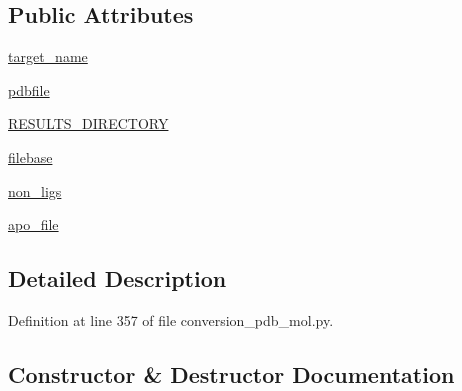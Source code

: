 \subsection*{Public Attributes}
\begin{DoxyCompactItemize}
\item 
\hyperlink{classfragalysis__api_1_1xcimporter_1_1conversion__pdb__mol_1_1pdb__apo_a334c98d4dfa204c7673f2f0bffdc60e1}{target\+\_\+name}
\item 
\hyperlink{classfragalysis__api_1_1xcimporter_1_1conversion__pdb__mol_1_1pdb__apo_a3c88c5322210bd36204fef2310fb80ce}{pdbfile}
\item 
\hyperlink{classfragalysis__api_1_1xcimporter_1_1conversion__pdb__mol_1_1pdb__apo_a110bfcd93d73bebd25ec64b258bd5b6a}{R\+E\+S\+U\+L\+T\+S\+\_\+\+D\+I\+R\+E\+C\+T\+O\+RY}
\item 
\hyperlink{classfragalysis__api_1_1xcimporter_1_1conversion__pdb__mol_1_1pdb__apo_a120a453eb2a3608650eda92ee0dc9ef9}{filebase}
\item 
\hyperlink{classfragalysis__api_1_1xcimporter_1_1conversion__pdb__mol_1_1pdb__apo_a53ed76d729f8d926151385334f611545}{non\+\_\+ligs}
\item 
\hyperlink{classfragalysis__api_1_1xcimporter_1_1conversion__pdb__mol_1_1pdb__apo_a9e655f451df734d5f78e8a41b8c47f89}{apo\+\_\+file}
\end{DoxyCompactItemize}


\subsection{Detailed Description}


Definition at line 357 of file conversion\+\_\+pdb\+\_\+mol.\+py.



\subsection{Constructor \& Destructor Documentation}
\mbox{\label{classfragalysis__api_1_1xcimporter_1_1conversion__pdb__mol_1_1pdb__apo_a4653e7fd666b7fd8e5bc4fe230e5e424}} 
